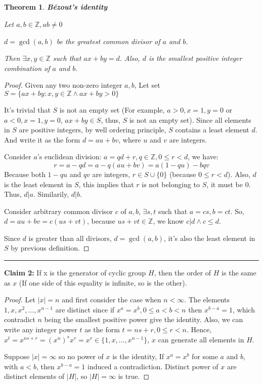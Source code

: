 \documentclass[12pt]{article}
\newtheorem{theorem}{Theorem}
\begin{document}
\subsection{} %
\begin{theorem} \textbf{Bézout's identity}

Let $a,b\in\mathbb{Z},ab\ne0$

$d=\gcd{(a,b)}$ be the greatest common divisor of $a$ and $b$. 

Then $\exists x,y\in\mathbb{Z}$ such that $ax+by=d$. Also, $d$ is the smallest positive integer combination of $a$ and $b$.
\end{theorem}
\begin{proof}

Given any two non-zero integer $a,b$, Let set $S=\{ax+by:x,y\in\mathbb{Z}\land ax+by>0\}$

It's trivial that $S$ is not an empty set (For example, $a>0,x=1,y=0$ or $a<0,x=1,y=0$, $ax+by\in S$, thus, $S$ is not an empty set). Since all elements in $S$ are positive integers, by well ordering principle, $S$ contains a least element $d$. And write it as the form $d=au+bv$, where $u$ and $v$ are integers.

Consider $a$'s euclidean division: $a=qd+r, q\in\mathbb{Z}, 0\le r < d$, we have:
\[r=a-qd=a-q(au+bv)=a(1-qu)-bqv\]
Because both $1-qu$ and $qv$ are integers, $r\in S\cup \{0\}$ (because $0\le r < d$). Also, $d$ is the least element in $S$, this implies that $r$ is not belonging to $S$, it must be $0$. Thus, $d|a$. Similarily, $d|b$.

Consider arbitrary common divisor $c$ of $a,b$, $\exists s,t$ such that $a=cs,b=ct$. So, $d=au+bv=c(us+vt)$, because $us+vt\in \mathbb{Z}$, we know $c|d\land c\le d$.

Since $d$ is greater than all divisors, $d=\gcd{(a,b)}$, it's also the least element in $S$ by previous definition.
\end{proof}

\noindent\rule{\textwidth}{1pt}
\noindent \textbf{Claim 2: } If x is the generator of cyclic group $H$, then the order of $H$ is the same as $x$ (If one side of this equality is infinite, so is the other).
\begin{proof}
Let $|x|=n$ and first consider the case when $n<\infty$. The elements $1,x,x^2,\dots,x^{n-1}$ are distinct since if $x^a=x^b,0\le a<b<n$ then $x^{b-a}=1$, which contradict $n$ being the smallest positive power give the identity. Also, we can write any integer power $t$ as the form $t=ns+r,0\le r<n$. Hence, $x^t=x^{ns+r}=(x^n)^sx^r=x^r\in\{1,x,\dots,x^{n-1}\}$, $x$ can generate all elements in $H$.

Suppose $|x|=\infty$ so no power of $x$ is the identity, If $x^a=x^b$ for some $a$ and $b$, with $a<b$, then $x^{b-a}=1$ induced a contradiction. Distinct power of $x$ are distinct elements of $|H|$, so $|H|=\infty$ is true.
\end{proof}
\end{document}
